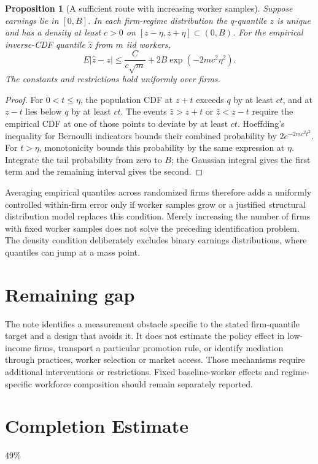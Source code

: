 \documentclass[11pt]{article}
\newtheorem{proposition}[theorem]{Proposition}
\theoremstyle{remark}
\begin{document}
\begin{proposition}[A sufficient route with increasing worker samples]
Suppose earnings lie in $[0,B]$. In each firm-regime distribution the $q$-quantile $z$ is unique and has a density at least $c>0$ on $[z-\eta,z+\eta]\subset(0,B)$. For the empirical inverse-CDF quantile $\widehat z$ from $m$ iid workers,
\[
 E|\widehat z-z|\le \frac{C}{c\sqrt m}
             +2B\exp(-2mc^2\eta^2).
\]
The constants and restrictions hold uniformly over firms.
\end{proposition}
\begin{proof}
For $0<t\le\eta$, the population CDF at $z+t$ exceeds $q$ by at least $ct$, and at $z-t$ lies below $q$ by at least $ct$. The events $\widehat z>z+t$ or $\widehat z<z-t$ require the empirical CDF at one of those points to deviate by at least $ct$. Hoeffding's inequality for Bernoulli indicators bounds their combined probability by $2e^{-2mc^2t^2}$. For $t>\eta$, monotonicity bounds this probability by the same expression at $\eta$. Integrate the tail probability from zero to $B$; the Gaussian integral gives the first term and the remaining interval gives the second.
\end{proof}
Averaging empirical quantiles across randomized firms therefore adds a uniformly controlled within-firm error only if worker samples grow or a justified structural distribution model replaces this condition. Merely increasing the number of firms with fixed worker samples does not solve the preceding identification problem. The density condition deliberately excludes binary earnings distributions, where quantiles can jump at a mass point.

\section*{Remaining gap}
The note identifies a measurement obstacle specific to the stated firm-quantile target and a design that avoids it. It does not estimate the policy effect in low-income firms, transport a particular promotion rule, or identify mediation through practices, worker selection or market access. Those mechanisms require additional interventions or restrictions. Fixed baseline-worker effects and regime-specific workforce composition should remain separately reported.

\section{Completion Estimate}
49\%
\end{document}
